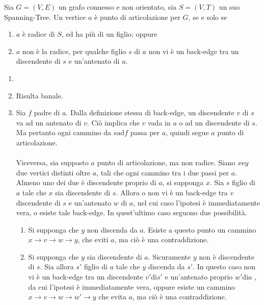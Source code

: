 \documentclass{subfiles}
\begin{document}
\begin{Lemma}
    Sia \(G = (V, E)\) un grafo connesso e non orientato, sia \(S = (V, T)\) un suo Spanning-Tree.
    Un vertice \(a\) è punto di articolazione per \(G\), se e solo se
    \begin{enumerate}
        \item \(a\) è radice di \(S\), ed ha più di un figlio; oppure
        \item \(a\) non è la radice, per qualche figlio \(s\) di \(a\) non vi è un back-edge tra un discendente di \(s\) e un'antenato di \(a\).
    \end{enumerate}

    \begin{Proof*}
        \begin{enumerate}
            \item []
            \item Risulta banale.
            \item Sia \(f\) padre di \(a\). Dalla definizione stessa di back-edge, un discendente \(v\) di \(s\) va ad un antenato di \(v\).
                  Ciò implica che \(v\) vada in \(a\) o ad un discendente di \(s\). Ma pertanto ogni cammino da \(s \text{ad} f\) passa per \(a\), quindi segue \(a\) punto di articolazione.
                  \\ \\
                  Viceversa, sia supposto \(a\) punto di articolazione, ma non radice. Siano \(x \text{e} y\) due vertici distinti oltre \(a\), tali che ogni cammino tra i due passi per \(a\).
                  Almeno uno dei due è discendente proprio di \(a\), si supponga \(x\). Sia \(s\) figlio di \(a\) tale che \(x\) sia discendente di \(s\).
                  Allora o non vi è un back-edge tra \(v\) discendente di \(s\) e un'antenato \(w\) di \(a\), nel cui caso l'ipotesi è immediatamente vera, o esiste tale back-edge.
                  In quest'ultimo caso seguono due possibilità.

                  \begin{enumerate}
                      \item Si supponga che \(y\) non discenda da \(a\). Esiste a questo punto un cammino \(x \to v \to w \to y\), che eviti \(a\), ma ciò è una contraddizione.
                      \item Si supponga che \(y\) sia discendente di \(a\). Sicuramente \(y\) non è discendente di \(s\). Sia allora \(s'\) figlio di \(a\) tale che \(y\) discenda da \(s'\).
                            In questo caso non vi è un back-edge tra un discendente \(v' \text{di} s'\) e un'antenato proprio \(w' \text{di} a\) , da cui l'ipotesi è immediatamente vera,
                            oppure esiste un cammino \(x \to v \to w \to w' \to y\) che evita \(a\), ma ciò è una contraddizione.

                  \end{enumerate}
        \end{enumerate}
    \end{Proof*}
\end{Lemma}
\end{document}
